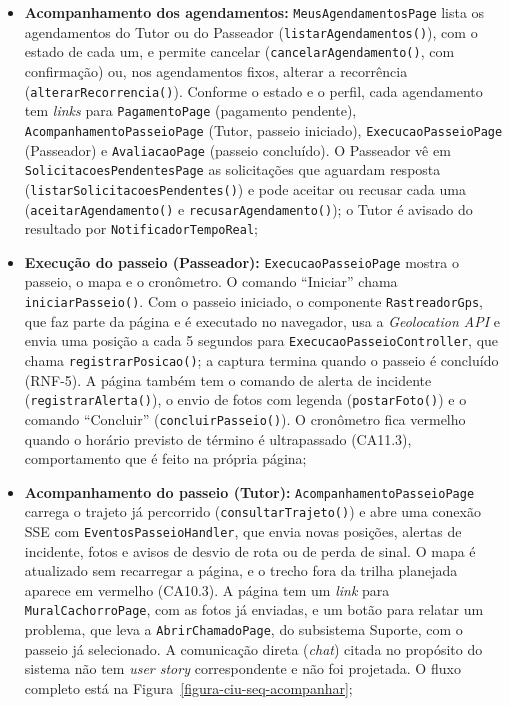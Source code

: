 \begin{sloppypar}
\begin{itemize}
	\item \textbf{Acompanhamento dos agendamentos:} \texttt{MeusAgendamentosPage} lista os agendamentos do Tutor ou do Passeador (\texttt{listarAgendamentos()}), com o estado de cada um, e permite cancelar (\texttt{cancelarAgendamento()}, com confirmação) ou, nos agendamentos fixos, alterar a recorrência (\texttt{alterarRecorrencia()}). Conforme o estado e o perfil, cada agendamento tem \textit{links} para \texttt{PagamentoPage} (pagamento pendente), \texttt{Acompanhamento\-PasseioPage} (Tutor, passeio iniciado), \texttt{ExecucaoPasseioPage} (Passeador) e \texttt{AvaliacaoPage} (passeio concluído). O Passeador vê em \texttt{Solicitacoes\-PendentesPage} as solicitações que aguardam resposta (\texttt{listarSolicitacoes\-Pendentes()}) e pode aceitar ou recusar cada uma (\texttt{aceitarAgendamento()} e \texttt{recusarAgendamento()}); o Tutor é avisado do resultado por \texttt{NotificadorTempoReal};
	\item \textbf{Execução do passeio (Passeador):} \texttt{ExecucaoPasseioPage} mostra o passeio, o mapa e o cronômetro. O comando ``Iniciar'' chama \texttt{iniciarPasseio()}. Com o passeio iniciado, o componente \texttt{RastreadorGps}, que faz parte da página e é executado no navegador, usa a \textit{Geolocation API} e envia uma posição a cada 5 segundos para \texttt{ExecucaoPasseioController}, que chama \texttt{registrarPosicao()}; a captura termina quando o passeio é concluído (RNF-5). A página também tem o comando de alerta de incidente (\texttt{registrarAlerta()}), o envio de fotos com legenda (\texttt{postarFoto()}) e o comando ``Concluir'' (\texttt{concluirPasseio()}). O cronômetro fica vermelho quando o horário previsto de término é ultrapassado (CA11.3), comportamento que é feito na própria página;
	\item \textbf{Acompanhamento do passeio (Tutor):} \texttt{Acompanhamento\-PasseioPage} carrega o trajeto já percorrido (\texttt{consultarTrajeto()}) e abre uma conexão SSE com \texttt{EventosPasseioHandler}, que envia novas posições, alertas de incidente, fotos e avisos de desvio de rota ou de perda de sinal. O mapa é atualizado sem recarregar a página, e o trecho fora da trilha planejada aparece em vermelho (CA10.3). A página tem um \textit{link} para \texttt{MuralCachorroPage}, com as fotos já enviadas, e um botão para relatar um problema, que leva a \texttt{AbrirChamadoPage}, do subsistema Suporte, com o passeio já selecionado. A comunicação direta (\textit{chat}) citada no propósito do sistema não tem \textit{user story} correspondente e não foi projetada. O fluxo completo está na Figura~\ref{figura-ciu-seq-acompanhar};

\end{itemize}
\end{sloppypar}
